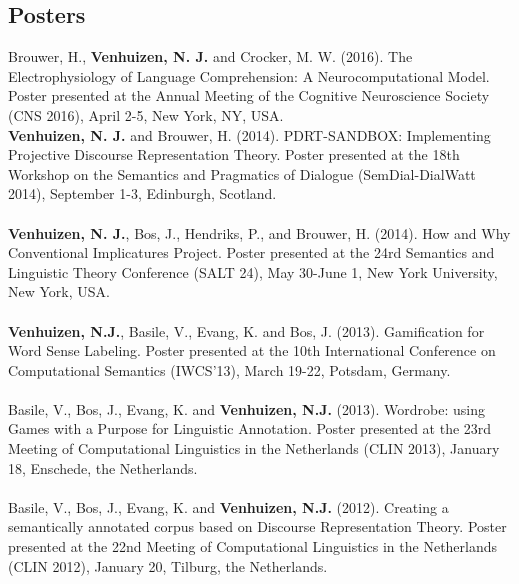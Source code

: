 \documentclass[a4paper,10pt]{article}
\begin{document}
\subsection*{Posters}

\noindent
    Brouwer, H., \textbf{Venhuizen, N. J.} and Crocker, M. W. (2016). The
    Electrophysiology of Language Comprehension: A Neurocomputational Model.
    Poster presented at the Annual Meeting of the Cognitive Neuroscience
    Society (CNS 2016), April 2-5, New York, NY, USA.
    \\
    \textbf{Venhuizen, N. J.} and Brouwer, H. (2014). PDRT-SANDBOX:
    Implementing Projective Discourse Representation Theory. Poster
    presented at the 18th Workshop on the Semantics and Pragmatics of
    Dialogue (SemDial-DialWatt 2014), September 1-3, Edinburgh, Scotland.\\
    \\
    \textbf{Venhuizen, N. J.}, Bos, J., Hendriks, P., and Brouwer, H.
    (2014). How and Why Conventional Implicatures Project. Poster presented
    at the 24rd Semantics and Linguistic Theory Conference (SALT 24), May
    30-June 1, New York University, New York, USA.\\
    \\
    \textbf{Venhuizen, N.J.}, Basile, V., Evang, K. and Bos, J. (2013).
    Gamification for Word Sense Labeling. Poster presented at the 10th
    International Conference on Computational Semantics (IWCS'13), March
    19-22, Potsdam, Germany.\\
    \\
    Basile, V., Bos, J., Evang, K. and \textbf{Venhuizen, N.J.} (2013).
    Wordrobe: using Games with a Purpose for Linguistic Annotation. Poster
    presented at the 23rd Meeting of Computational Linguistics in the
    Netherlands (CLIN 2013), January 18, Enschede, the Netherlands.\\
    \\
    Basile, V., Bos, J., Evang, K. and \textbf{Venhuizen, N.J.} (2012).
    Creating a semantically annotated corpus based on Discourse
    Representation Theory. Poster presented at the 22nd Meeting of
    Computational Linguistics in the Netherlands (CLIN 2012), January 20,
    Tilburg, the Netherlands.

\end{document}
